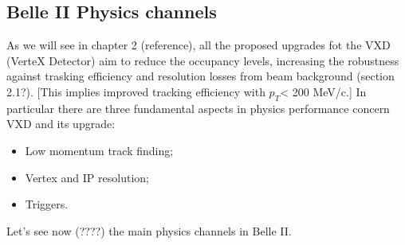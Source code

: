 \subsection{Belle II Physics channels}

As we will see in chapter 2 (reference), all the proposed upgrades fot the VXD (VerteX Detector) aim to reduce the occupancy levels, increasing the robustness against trasking efficiency and resolution losses from beam background (section 2.1?). [This implies improved tracking efficiency with $p_{T}$< 200 MeV/c.]
In particular there are three fundamental aspects in physics performance concern VXD and its upgrade:

\begin{itemize}
\itemsep0em
\item Low momentum track finding; 
\item Vertex and IP resolution;
\item Triggers.
\end{itemize}

Let's see now (????) the main physics channels in Belle II. \\


